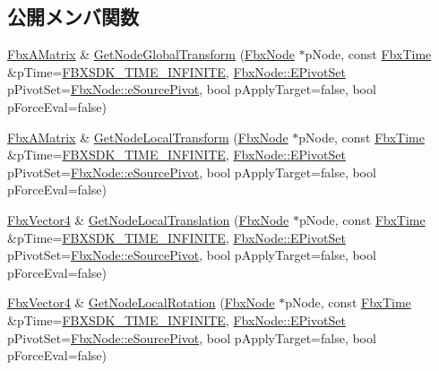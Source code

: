 \subsection*{公開メンバ関数}
\begin{DoxyCompactItemize}
\item 
\hyperlink{class_fbx_a_matrix}{Fbx\+A\+Matrix} \& \hyperlink{class_fbx_anim_evaluator_a40d669964d698df2551ee3571c211312}{Get\+Node\+Global\+Transform} (\hyperlink{class_fbx_node}{Fbx\+Node} $\ast$p\+Node, const \hyperlink{class_fbx_time}{Fbx\+Time} \&p\+Time=\hyperlink{fbxtime_8h_a1e6db3fe0f84f0b7daa775739f93526f}{F\+B\+X\+S\+D\+K\+\_\+\+T\+I\+M\+E\+\_\+\+I\+N\+F\+I\+N\+I\+TE}, \hyperlink{class_fbx_node_ae62b7311ac4727654cdf1ebd5cbf7343}{Fbx\+Node\+::\+E\+Pivot\+Set} p\+Pivot\+Set=\hyperlink{class_fbx_node_ae62b7311ac4727654cdf1ebd5cbf7343ae8ed37a5c7e41f8d1cec9d3fa8424b69}{Fbx\+Node\+::e\+Source\+Pivot}, bool p\+Apply\+Target=false, bool p\+Force\+Eval=false)
\item 
\hyperlink{class_fbx_a_matrix}{Fbx\+A\+Matrix} \& \hyperlink{class_fbx_anim_evaluator_a3b451f7466d6730816bf56a3b5441379}{Get\+Node\+Local\+Transform} (\hyperlink{class_fbx_node}{Fbx\+Node} $\ast$p\+Node, const \hyperlink{class_fbx_time}{Fbx\+Time} \&p\+Time=\hyperlink{fbxtime_8h_a1e6db3fe0f84f0b7daa775739f93526f}{F\+B\+X\+S\+D\+K\+\_\+\+T\+I\+M\+E\+\_\+\+I\+N\+F\+I\+N\+I\+TE}, \hyperlink{class_fbx_node_ae62b7311ac4727654cdf1ebd5cbf7343}{Fbx\+Node\+::\+E\+Pivot\+Set} p\+Pivot\+Set=\hyperlink{class_fbx_node_ae62b7311ac4727654cdf1ebd5cbf7343ae8ed37a5c7e41f8d1cec9d3fa8424b69}{Fbx\+Node\+::e\+Source\+Pivot}, bool p\+Apply\+Target=false, bool p\+Force\+Eval=false)
\item 
\hyperlink{class_fbx_vector4}{Fbx\+Vector4} \& \hyperlink{class_fbx_anim_evaluator_a3f430f456d4f093a3c8682a874ec8145}{Get\+Node\+Local\+Translation} (\hyperlink{class_fbx_node}{Fbx\+Node} $\ast$p\+Node, const \hyperlink{class_fbx_time}{Fbx\+Time} \&p\+Time=\hyperlink{fbxtime_8h_a1e6db3fe0f84f0b7daa775739f93526f}{F\+B\+X\+S\+D\+K\+\_\+\+T\+I\+M\+E\+\_\+\+I\+N\+F\+I\+N\+I\+TE}, \hyperlink{class_fbx_node_ae62b7311ac4727654cdf1ebd5cbf7343}{Fbx\+Node\+::\+E\+Pivot\+Set} p\+Pivot\+Set=\hyperlink{class_fbx_node_ae62b7311ac4727654cdf1ebd5cbf7343ae8ed37a5c7e41f8d1cec9d3fa8424b69}{Fbx\+Node\+::e\+Source\+Pivot}, bool p\+Apply\+Target=false, bool p\+Force\+Eval=false)
\item 
\hyperlink{class_fbx_vector4}{Fbx\+Vector4} \& \hyperlink{class_fbx_anim_evaluator_a8ffff0649bfdf67d6508a72f8787d895}{Get\+Node\+Local\+Rotation} (\hyperlink{class_fbx_node}{Fbx\+Node} $\ast$p\+Node, const \hyperlink{class_fbx_time}{Fbx\+Time} \&p\+Time=\hyperlink{fbxtime_8h_a1e6db3fe0f84f0b7daa775739f93526f}{F\+B\+X\+S\+D\+K\+\_\+\+T\+I\+M\+E\+\_\+\+I\+N\+F\+I\+N\+I\+TE}, \hyperlink{class_fbx_node_ae62b7311ac4727654cdf1ebd5cbf7343}{Fbx\+Node\+::\+E\+Pivot\+Set} p\+Pivot\+Set=\hyperlink{class_fbx_node_ae62b7311ac4727654cdf1ebd5cbf7343ae8ed37a5c7e41f8d1cec9d3fa8424b69}{Fbx\+Node\+::e\+Source\+Pivot}, bool p\+Apply\+Target=false, bool p\+Force\+Eval=false)

\end{DoxyCompactItemize}
